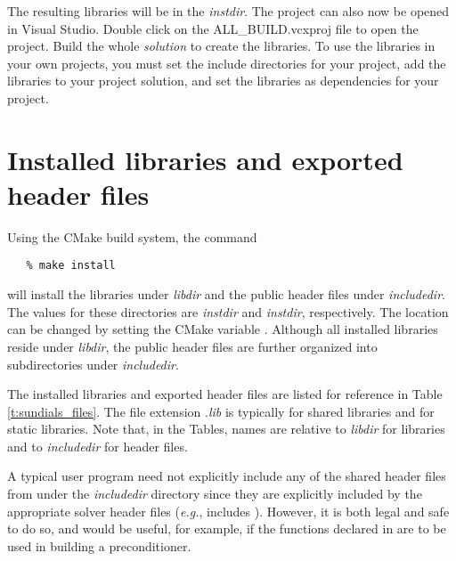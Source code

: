 \noindent The resulting libraries will be in the {\em instdir}.
\noindent The {\sundials} project can also now be opened in Visual Studio.
Double click on the ALL\_BUILD.vcxproj file to open the project.
Build the whole {\em solution} to create the {\sundials} libraries.
To use the {\sundials} libraries in your own projects, you must
set the include directories for your project,
add the {\sundials} libraries to your project solution,
and set the {\sundials} libraries as dependencies for your project.

\section{Installed libraries and exported header files}

Using the CMake {\sundials} build system, the command
\begin{verbatim}
   % make install
\end{verbatim}
will install the libraries under {\em libdir} and the public header
files under {\em includedir}. The values for these directories are
{\em instdir} and {\em instdir},
respectively. The location can be changed by setting the CMake variable .
Although all installed libraries reside under {\em libdir}, the public
header files are further organized into subdirectories under {\em includedir}.

The installed libraries and exported header files are listed for
reference in Table \ref{t:sundials_files}.
The file extension .{\em lib}
is typically  for shared libraries and  for static libraries.
Note that, in the Tables, names are relative to {\em libdir}
for libraries and to {\em includedir} for header files.

A typical user program need not explicitly include any of the shared
{\sundials} header files from under the {\em includedir}
directory since they are explicitly included by the appropriate solver
header files ({\em e.g.},  includes
). However, it is both legal and safe to do so,
and would be useful, for example, if the functions declared in 
are to be used in building a preconditioner.


